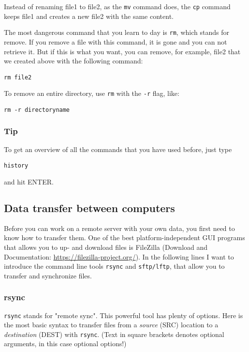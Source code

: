 \documentclass[11pt]{article}
\begin{document}
Instead of renaming file1 to file2, as the \texttt{mv} command does, the \texttt{cp}
command keeps file1 and creates a new file2 with the same content.

The most dangerous command that you learn to day is \texttt{rm}, which stands
for remove. If you remove a file with this command, it is gone and you
can not retrieve it. But if this is what you want, you can remove, for
example, file2 that we created above with the following command:


\begin{verbatim}
rm file2
\end{verbatim}

To remove an entire directory, use \texttt{rm} with the \texttt{-r} flag, like:

\begin{verbatim}
rm -r directoryname
\end{verbatim}

\subsubsection{Tip}
\label{sec-2-1-8}
To get an overview of all the commands that you have used before, just
type


\begin{verbatim}
history
\end{verbatim}

and hit ENTER.

\subsection{Data transfer between computers}
\label{sec-2-2}
Before you can work on a remote server with your own data, you first
need to know how to transfer them.  One of the best
platform-independent GUI programs that allows you to up- and download
files is FileZilla (Download and Documentation:
\url{https://filezilla-project.org/}). In the following lines I want to
introduce the command line tools \texttt{rsync} and \texttt{sftp/lftp}, that allow
you to transfer and synchronize files.
\subsubsection{rsync}
\label{sec-2-2-1}


\texttt{rsync} stands for "remote sync". This powerful tool has plenty of
options.  Here is the most basic syntax to transfer files from a
\emph{source} (SRC) location to a \emph{destination} (DEST) with \texttt{rsync}. (Text
in square brackets denotes optional arguments, in this case optional
options!)
\end{document}
